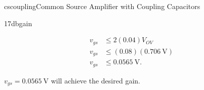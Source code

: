 \begin{mainquestion}{cscoupling}{Common Source Amplifier with Coupling Capacitors}
\begin{partquestion}{17dbgain}
\begin{answer}
\begin{align*}
v_{gs} &\leq 2(0.04)V_{OV}\\
v_{gs} &\leq (0.08)(0.706\ \text{V})\\
v_{gs} &\leq 0.0565\ \text{V}.
\end{align*}

$v_{gs} = 0.0565\ \text{V}$ will achieve the desired gain.
\end{answer}
\end{partquestion}

\end{mainquestion}
